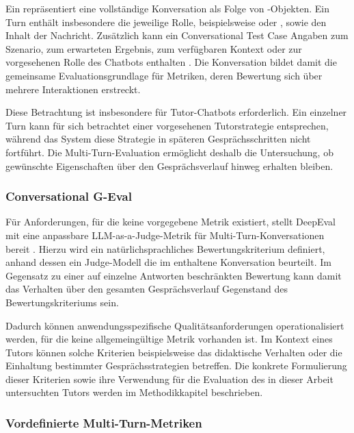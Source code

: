 Ein \texttt{} repräsentiert eine vollständige Konversation als Folge von \texttt{}-Objekten. Ein Turn enthält insbesondere die jeweilige Rolle, beispielsweise \texttt{} oder \texttt{}, sowie den Inhalt der Nachricht. Zusätzlich kann ein Conversational Test Case Angaben zum Szenario, zum erwarteten Ergebnis, zum verfügbaren Kontext oder zur vorgesehenen Rolle des Chatbots enthalten \cite{DeepEvalConversationalTestCase}. Die Konversation bildet damit die gemeinsame Evaluationsgrundlage für Metriken, deren Bewertung sich über mehrere Interaktionen erstreckt.
 
Diese Betrachtung ist insbesondere für Tutor-Chatbots erforderlich. Ein einzelner Turn kann für sich betrachtet einer vorgesehenen Tutorstrategie entsprechen, während das System diese Strategie in späteren Gesprächsschritten nicht fortführt. Die Multi-Turn-Evaluation ermöglicht deshalb die Untersuchung, ob gewünschte Eigenschaften über den Gesprächsverlauf hinweg erhalten bleiben.
 
\subsubsection{Conversational G-Eval}
\label{subsubsec:conversational_geval}
 
Für Anforderungen, für die keine vorgegebene Metrik existiert, stellt DeepEval mit \texttt{} eine anpassbare LLM-as-a-Judge-Metrik für Multi-Turn-Konversationen bereit \cite{DeepEvalConversationalGEval}. Hierzu wird ein natürlichsprachliches Bewertungskriterium definiert, anhand dessen ein Judge-Modell die im \texttt{} enthaltene Konversation beurteilt. Im Gegensatz zu einer auf einzelne Antworten beschränkten Bewertung kann damit das Verhalten über den gesamten Gesprächsverlauf Gegenstand des Bewertungskriteriums sein.
 
Dadurch können anwendungsspezifische Qualitätsanforderungen operationalisiert werden, für die keine allgemeingültige Metrik vorhanden ist. Im Kontext eines Tutors können solche Kriterien beispielsweise das didaktische Verhalten oder die Einhaltung bestimmter Gesprächsstrategien betreffen. Die konkrete Formulierung dieser Kriterien sowie ihre Verwendung für die Evaluation des in dieser Arbeit untersuchten Tutors werden im Methodikkapitel beschrieben.
 
\subsubsection{Vordefinierte Multi-Turn-Metriken}
\label{subsubsec:multiturn_metrics}
 
